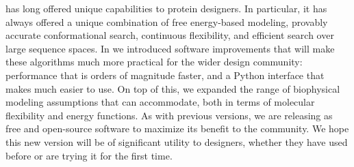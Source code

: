 \osprey has long offered unique capabilities to protein designers.  In particular, it has always offered a unique combination of free energy-based modeling, provably accurate conformational search, continuous flexibility, and efficient search over large sequence spaces.  In  we introduced software improvements that will make these algorithms much more practical for the wider design community: performance that is orders of magnitude faster, and a Python interface that makes \osprey much easier to use.  On top of this, we expanded the range of biophysical modeling assumptions that \osprey can accommodate, both in terms of molecular flexibility and energy functions.  As with previous versions, we are releasing  as free and open-source software to maximize its benefit to the community.  We hope this new version will be of significant utility to designers, whether they have used \osprey before or are trying it for the first time.  

